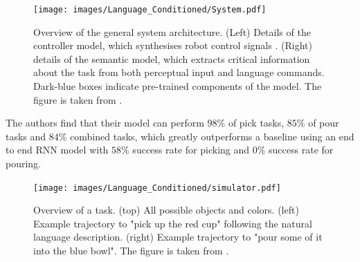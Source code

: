 \begin{figure}[htbp]
    \centering
    \texttt{[image: images/Language\_Conditioned/System.pdf]}
    \caption{Overview of the general system architecture. (Left) Details of the controller model, which
    synthesises robot control signals . (Right) details of the semantic model, which extracts critical
    information about the task from both perceptual input and language commands. Dark-blue boxes
    indicate pre-trained components of the model. The figure is taken from \cite{stepputtis2020languageconditioned}.}
    \label{language_imitation}
\end{figure}

The authors find that their model can perform $98 \%$ of pick tasks, $85 \%$ of pour tasks and $84 \%$ combined 
tasks, which greatly outperforms a baseline using an end to end RNN model with $58\%$ success rate for picking and $0 \%$ success rate for pouring.

\begin{figure}[htbp]
    \centering
    \texttt{[image: images/Language\_Conditioned/simulator.pdf]}
    \caption{Overview of a task. (top) All possible objects and colors. (left) Example trajectory to "pick up the red cup" following the natural language description. 
    (right) Example trajectory to "pour some of it into the blue bowl". The figure is taken from \cite{stepputtis2020languageconditioned}.}
    \label{lang_imi_expl}
\end{figure}
